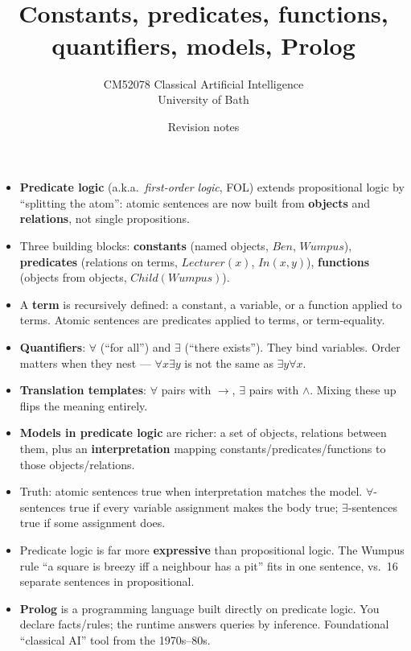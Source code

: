 \documentclass[11pt, a4paper]{article}
\title{\vspace{-1cm}{\Huge\bfseries Week 8 — Logical Reasoning: Predicate Logic} \\[0.4em]{\large Constants, predicates, functions, quantifiers, models, Prolog}}
\author{\large CM52078 Classical Artificial Intelligence \\[0.2em]\normalsize University of Bath}
\date{Revision notes}
\begin{document}
\maketitle
\thispagestyle{empty}

\vspace{1em}

\begin{tldrbox}
\begin{itemize}[leftmargin=*]
  \item \textbf{Predicate logic} (a.k.a.\ \emph{first-order logic}, FOL) extends propositional logic by ``splitting the atom'': atomic sentences are now built from \textbf{objects} and \textbf{relations}, not single propositions.
  \item Three building blocks: \textbf{constants} (named objects, $Ben$, $Wumpus$), \textbf{predicates} (relations on terms, $Lecturer(x)$, $In(x, y)$), \textbf{functions} (objects from objects, $Child(Wumpus)$).
  \item A \textbf{term} is recursively defined: a constant, a variable, or a function applied to terms. Atomic sentences are predicates applied to terms, or term-equality.
  \item \textbf{Quantifiers}: $\forall$ (``for all'') and $\exists$ (``there exists''). They bind variables. Order matters when they nest — $\forall x \exists y$ is not the same as $\exists y \forall x$.
  \item \textbf{Translation templates}: $\forall$ pairs with $\rightarrow$, $\exists$ pairs with $\land$. Mixing these up flips the meaning entirely.
  \item \textbf{Models in predicate logic} are richer: a set of objects, relations between them, plus an \textbf{interpretation} mapping constants/predicates/functions to those objects/relations.
  \item Truth: atomic sentences true when interpretation matches the model. $\forall$-sentences true if every variable assignment makes the body true; $\exists$-sentences true if some assignment does.
  \item Predicate logic is far more \textbf{expressive} than propositional logic. The Wumpus rule ``a square is breezy iff a neighbour has a pit'' fits in one sentence, vs.\ 16 separate sentences in propositional.
  \item \textbf{Prolog} is a programming language built directly on predicate logic. You declare facts/rules; the runtime answers queries by inference. Foundational ``classical AI'' tool from the 1970s--80s.
\end{itemize}
\end{tldrbox}
\end{document}

